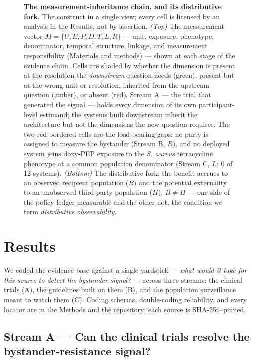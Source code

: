 \documentclass[10pt,letterpaper]{article}
\begin{document}
\begin{figure}[!h]
\caption{{\bf The measurement-inheritance chain, and its distributive fork.}
The construct in a single view; every cell is licensed by an analysis in the Results, not by
assertion. \emph{(Top)} The measurement vector $M = \{U, E, P, D, T, L, R\}$ --- unit, exposure,
phenotype, denominator, temporal structure, linkage, and measurement responsibility (Materials and
methods) --- shown at each stage of the evidence chain. Cells are shaded by whether the dimension is
present at the resolution the \emph{downstream} question needs (green), present but at the wrong unit
or resolution, inherited from the upstream question (amber), or absent (red). Stream A --- the trial
that generated the signal --- holds every dimension of its own participant-level estimand; the systems
built downstream inherit the architecture but not the dimensions the new question requires. The two
red-bordered cells are the load-bearing gaps: no party is assigned to measure the bystander (Stream B,
$R$), and no deployed system joins doxy-PEP exposure to the \emph{S. aureus} tetracycline phenotype at
a common population denominator (Stream C, $L$; 0 of 12 systems). \emph{(Bottom)} The distributive
fork: the benefit accrues to an observed recipient population ($B$) and the potential externality to an
unobserved third-party population ($H$), $B \neq H$ --- one side of the policy ledger measurable and
the other not, the condition we term \emph{distributive observability}.}
\label{fig1}
\end{figure}

\section*{Results}

We coded the evidence base against a single yardstick --- \emph{what
would it take for this source to detect the bystander signal?} ---
across three streams: the clinical trials (A), the guidelines built on
them (B), and the population surveillance meant to watch them (C).
Coding schemas, double-coding reliability, and every locator are in the
Methods and the repository; each source is SHA-256--pinned.

\subsection*{Stream A --- Can the clinical trials resolve the bystander-resistance signal?}
\end{document}

